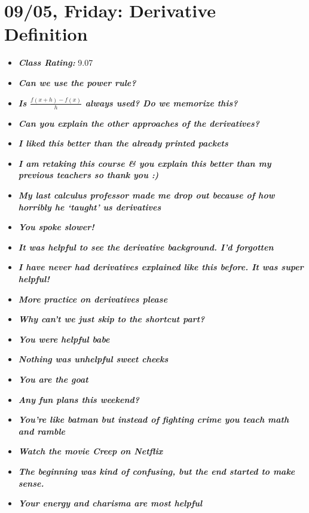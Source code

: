 \documentclass[11pt,letterpaper]{article}
\begin{document}
\newpage
\section*{09/05, Friday: Derivative Definition\label{09-05}}

\begin{itemize}
\item {\bfseries\itshape Class Rating:} 9.07
\item {\bfseries\itshape Can we use the power rule?}
\item {\bfseries\itshape Is $\tfrac{f(x + h) - f(x)}{h}$ always used? Do we memorize this?}
\item {\bfseries\itshape Can you explain the other approaches of the derivatives?} 

\item {\bfseries\itshape I liked this better than the already printed packets}
\item {\bfseries\itshape I am retaking this course \& you explain this better than my previous teachers so thank you :) }
\item {\bfseries\itshape My last calculus professor made me drop out because of how horribly he `taught' us derivatives} 
\item {\bfseries\itshape You spoke slower!}
\item {\bfseries\itshape It was helpful to see the derivative background. I'd forgotten}
\item {\bfseries\itshape I have never had derivatives explained like this before. It was super helpful!}
\item {\bfseries\itshape More practice on derivatives please}
\item {\bfseries\itshape Why can't we just skip to the shortcut part?}
\item {\bfseries\itshape You were helpful babe}
\item {\bfseries\itshape Nothing was unhelpful sweet cheeks}
\item {\bfseries\itshape You are the goat}
\item {\bfseries\itshape Any fun plans this weekend?}
\item {\bfseries\itshape You're like batman but instead of fighting crime you teach math and ramble} 
\item {\bfseries\itshape Watch the movie Creep on Netflix}
\item {\bfseries\itshape The beginning was kind of confusing, but the end started to make sense.}
\item {\bfseries\itshape Your energy and charisma are most helpful} 

\end{itemize}
\end{document}
